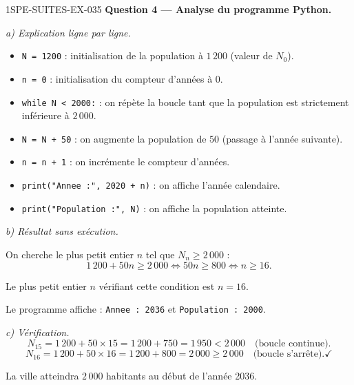 \begin{corrige}{1SPE-SUITES-EX-035}
\medskip
\textbf{Question 4 — Analyse du programme Python.}

\textit{a) Explication ligne par ligne.}

\begin{itemize}
  \item \texttt{N = 1200} : initialisation de la population à $1\,200$ (valeur de $N_0$).
  \item \texttt{n = 0} : initialisation du compteur d'années à $0$.
  \item \texttt{while N < 2000:} : on répète la boucle tant que la population est strictement inférieure à $2\,000$.
  \item \texttt{N = N + 50} : on augmente la population de $50$ (passage à l'année suivante).
  \item \texttt{n = n + 1} : on incrémente le compteur d'années.
  \item \texttt{print("Annee :", 2020 + n)} : on affiche l'année calendaire.
  \item \texttt{print("Population :", N)} : on affiche la population atteinte.
\end{itemize}

\textit{b) Résultat sans exécution.}

On cherche le plus petit entier $n$ tel que $N_n \geq 2\,000$ :
\[
  1\,200 + 50n \geq 2\,000 \iff 50n \geq 800 \iff n \geq 16.
\]


Le plus petit entier $n$ vérifiant cette condition est $n = 16$.

Le programme affiche : \texttt{Annee : 2036} et \texttt{Population : 2000}.

\textit{c) Vérification.}
\[
  N_{15} = 1\,200 + 50 \times 15 = 1\,200 + 750 = 1\,950 < 2\,000 \quad \text{(boucle continue)}.
\]
\[
  N_{16} = 1\,200 + 50 \times 16 = 1\,200 + 800 = 2\,000 \geq 2\,000 \quad \text{(boucle s'arrête)}. \checkmark
\]

La ville atteindra $2\,000$ habitants au début de l'année 2036.

\end{corrige}
